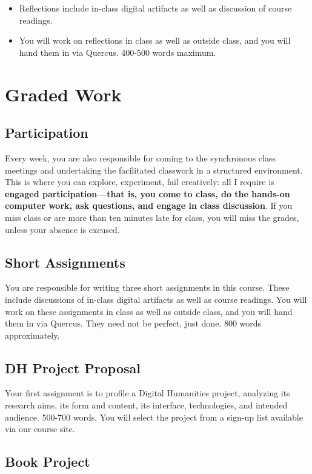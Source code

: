\documentclass[11pt]{article}
\begin{document}
\begin{itemize}
\item Reflections include in-class digital artifacts as well as discussion of course readings.
\item You will work on reflections in class as well as outside class, and you will hand them in via Quercus. 400-500 words maximum.
\end{itemize}

\section*{Graded Work}
\label{sec:org01d0513}
\subsection*{Participation}
\label{sec:org9d1366b}
Every week, you are also responsible for coming to the synchronous class meetings and undertaking the facilitated classwork in a structured environment.  This is where you can explore, experiment, fail creatively:  all I require is \textbf{engaged participation—that is, you come to class, do the hands-on computer work, ask questions, and engage in class discussion}. If you miss class or are more than ten minutes late for class, you will miss the grades, unless your absence is excused. 
\subsection*{Short Assignments}
\label{sec:org1267fd1}
You are responsible for writing three short assignments in this course. These include discussions of in-class digital artifacts as well as course readings. You will work on these assignments in class as well as outside class, and you will hand them in via Quercus. They need not be perfect, just done. 800 words approximately.
\subsection*{DH Project Proposal}
\label{sec:org19d0ac8}

Your first assignment is to profile a Digital Humanities project, analyzing its research aims, its form and content, its interface, technologies, and intended audience. 500-700 words. You will select the project from a sign-up list available via our course site.

\subsection*{Book Project}
\label{sec:org704b29c}
\end{document}
